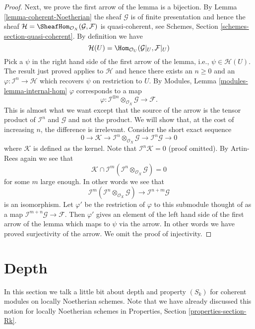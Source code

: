 \begin{proof}
\medskip\noindent
Next, we prove the first arrow of the lemma is a bijection.
By Lemma \ref{lemma-coherent-Noetherian} the sheaf $\mathcal{G}$
is of finite presentation and hence the sheaf
$\mathcal{H} = \SheafHom_{\mathcal{O}_X}(\mathcal{G}, \mathcal{F})$
is quasi-coherent, see
Schemes, Section \ref{schemes-section-quasi-coherent}.
By definition we have
$$
\mathcal{H}(U)
=
\Hom_{\mathcal{O}_U}(\mathcal{G}|_U, \mathcal{F}|_U)
$$
Pick a $\psi$ in the right hand side of the first arrow of the
lemma, i.e.,  $\psi \in \mathcal{H}(U)$. The result just proved applies
to $\mathcal{H}$ and hence there exists an $n \geq 0$ and an
$\varphi : \mathcal{I}^n \to \mathcal{H}$ which recovers
$\psi$ on restriction to $U$. By
Modules, Lemma \ref{modules-lemma-internal-hom}
$\varphi$ corresponds to a map
$$
\varphi :
\mathcal{I}^{\otimes n} \otimes_{\mathcal{O}_X} \mathcal{G}
\longrightarrow
\mathcal{F}.
$$
This is almost what we want except that the source of the arrow
is the tensor product of $\mathcal{I}^n$ and $\mathcal{G}$
and not the product. We will show that, at the cost of increasing $n$,
the difference is irrelevant. Consider the short exact sequence
$$
0 \to \mathcal{K} \to
\mathcal{I}^n \otimes_{\mathcal{O}_X} \mathcal{G} \to
\mathcal{I}^n\mathcal{G} \to 0
$$
where $\mathcal{K}$ is defined as the kernel. Note that
$\mathcal{I}^n\mathcal{K} = 0$ (proof omitted). By Artin-Rees
again we see that
$$
\mathcal{K}
\cap
\mathcal{I}^m(\mathcal{I}^n \otimes_{\mathcal{O}_X} \mathcal{G})
=
0
$$
for some $m$ large enough. In other words we see that
$$
\mathcal{I}^m(\mathcal{I}^n \otimes_{\mathcal{O}_X} \mathcal{G})
\longrightarrow
\mathcal{I}^{n + m}\mathcal{G}
$$
is an isomorphism. Let $\varphi'$ be the restriction of
$\varphi$ to this submodule thought of as a map
$\mathcal{I}^{m + n}\mathcal{G} \to \mathcal{F}$.
Then $\varphi'$ gives an element
of the left hand side of the first arrow of the lemma which
maps to $\psi$ via the arrow. In other words we have proved surjectivity
of the arrow. We omit the proof of injectivity.
\end{proof}









\section{Depth}
\label{section-depth}

\noindent
In this section we talk a little bit about depth and property
$(S_k)$ for coherent modules on locally Noetherian schemes.
Note that we have already discussed this notion for locally
Noetherian schemes in Properties, Section \ref{properties-section-Rk}.

